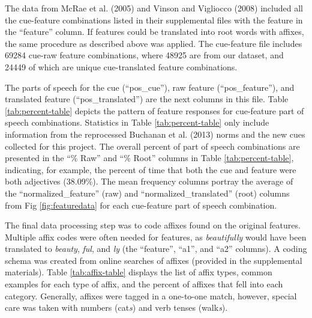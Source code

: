 \documentclass[english,,man]{apa6}
\begin{document}
The data from McRae et al. (2005) and Vinson and Vigliocco (2008) included all the cue-feature combinations listed in their supplemental files with the feature in the \enquote{feature} column. If features could be translated into root words with affixes, the same procedure as described above was applied. The cue-feature file includes 69284 cue-raw feature combinations, where 48925 are from our dataset, and 24449 of which are unique cue-translated feature combinations.

The parts of speech for the cue (\enquote{pos\_cue}), raw feature (\enquote{pos\_feature}), and translated feature (\enquote{pos\_translated}) are the next columns in this file. Table \ref{tab:percent-table} depicts the pattern of feature responses for cue-feature part of speech combinations. Statistics in Table \ref{tab:percent-table} only include information from the reprocessed Buchanan et al. (2013) norms and the new cues collected for this project. The overall percent of part of speech combinations are presented in the \enquote{\% Raw} and \enquote{\% Root} columns in Table \ref{tab:percent-table}, indicating, for example, the percent of time that both the cue and feature were both adjectives (38.09\%). The mean frequency columns portray the average of the \enquote{normalized\_feature} (raw) and \enquote{normalized\_translated} (root) columns from Fig \ref{fig:featuredata} for each cue-feature part of speech combination.

The final data processing step was to code affixes found on the original features. Multiple affix codes were often needed for features, as \emph{beautifully} would have been translated to \emph{beauty}, \emph{ful}, and \emph{ly} (the \enquote{feature}, \enquote{a1}, and \enquote{a2} columns). A coding schema was created from online searches of affixes (provided in the supplemental materials). Table \ref{tab:affix-table} displays the list of affix types, common examples for each type of affix, and the percent of affixes that fell into each category. Generally, affixes were tagged in a one-to-one match, however, special care was taken with numbers (cat\emph{s}) and verb tenses (walk\emph{s}).
\end{document}
